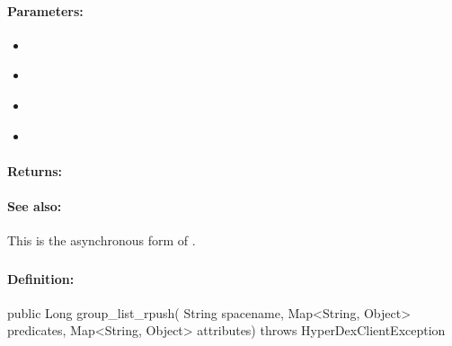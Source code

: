 \paragraph{Parameters:}
\begin{itemize}[noitemsep]
\item {}\\

\item {}\\

\item {}\\

\item {}\\

\end{itemize}

\paragraph{Returns:}


\paragraph{See also:}  This is the asynchronous form of .

\pagebreak
\subsubsection{}
\label{api:java:group_list_rpush}


\paragraph{Definition:}
\begin{javacode}
public Long group_list_rpush(
        String spacename,
        Map<String, Object> predicates,
        Map<String, Object> attributes) throws HyperDexClientException
\end{javacode}


